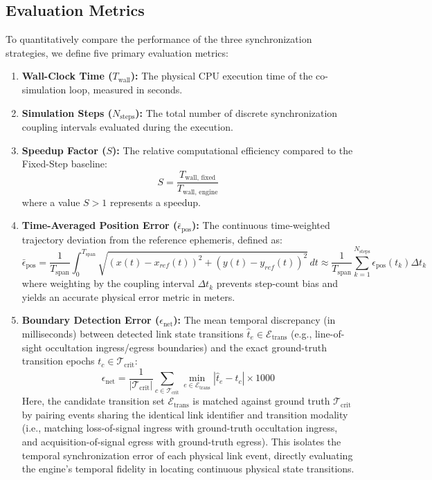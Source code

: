 \documentclass[a4paper,fleqn]{cas-sc}
\begin{document}
\subsection{Evaluation Metrics}
To quantitatively compare the performance of the three synchronization strategies, we define five primary evaluation metrics:
\begin{enumerate}
    \item \textbf{Wall-Clock Time ($T_{\text{wall}}$):} The physical CPU execution time of the co-simulation loop, measured in seconds.
    \item \textbf{Simulation Steps ($N_{\text{steps}}$):} The total number of discrete synchronization coupling intervals evaluated during the execution.
    \item \textbf{Speedup Factor ($S$):} The relative computational efficiency compared to the Fixed-Step baseline:
    \begin{equation}
        S = \frac{T_{\text{wall, fixed}}}{T_{\text{wall, engine}}}
    \end{equation}
    where a value $S > 1$ represents a speedup.
    \item {\color{revcolor}\textbf{Time-Averaged Position Error ($\bar{\epsilon}_{\text{pos}}$):} The continuous time-weighted trajectory deviation from the reference ephemeris, defined as:
    \begin{equation}
        \bar{\epsilon}_{\text{pos}} = \frac{1}{T_{\text{span}}} \int_0^{T_{\text{span}}} \sqrt{(x(t) - x_{ref}(t))^2 + (y(t) - y_{ref}(t))^2} \, dt \approx \frac{1}{T_{\text{span}}} \sum_{k=1}^{N_{\text{steps}}} \epsilon_{\text{pos}}(t_k) \Delta t_k
        \label{eq:pos_err_time_weighted}
    \end{equation}
    where weighting by the coupling interval $\Delta t_k$ prevents step-count bias and yields an accurate physical error metric in meters.}
    \item {\color{revcolor}\textbf{Boundary Detection Error ($\epsilon_{\text{net}}$):} The mean temporal discrepancy (in milliseconds) between detected link state transitions $\hat{t}_e \in \mathcal{E}_{\text{trans}}$ (e.g., line-of-sight occultation ingress/egress boundaries) and the exact ground-truth transition epochs $t_c \in \mathcal{T}_{\text{crit}}$:
    \begin{equation}
        \epsilon_{\text{net}} = \frac{1}{|\mathcal{T}_{\text{crit}}|} \sum_{c \in \mathcal{T}_{\text{crit}}} \min_{e \in \mathcal{E}_{\text{trans}}} |\hat{t}_e - t_c| \times 1000
        \label{eq:event_err_corrected}
    \end{equation}
    Here, the candidate transition set $\mathcal{E}_{\text{trans}}$ is matched against ground truth $\mathcal{T}_{\text{crit}}$ by pairing events sharing the identical link identifier and transition modality (i.e., matching loss-of-signal ingress with ground-truth occultation ingress, and acquisition-of-signal egress with ground-truth egress). This isolates the temporal synchronization error of each physical link event, directly evaluating the engine's temporal fidelity in locating continuous physical state transitions.}
\end{enumerate}
\end{document}
